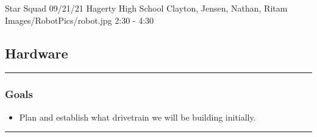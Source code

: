 \insertmeeting 
	{Star Squad} 
	{09/21/21}
	{Hagerty High School}
	{Clayton, Jensen, Nathan, Ritam}
	{Images/RobotPics/robot.jpg}
	{2:30 - 4:30}
	
\subsection*{Hardware}
\noindent\hfil\rule{\textwidth}{.4pt}\hfil
\subsubsection*{Goals}
\begin{itemize}
    \item Plan and establish what drivetrain we will be building initially.   

\end{itemize} 

\noindent\hfil\rule{\textwidth}{.4pt}\hfil

